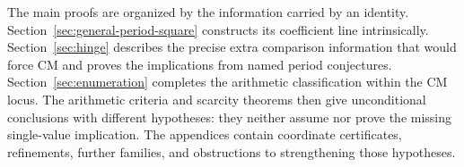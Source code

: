 The main proofs are organized by the information carried by an identity.
Section~\ref{sec:general-period-square} constructs its coefficient line
intrinsically. Section~\ref{sec:hinge} describes the precise extra
comparison information that would force CM and proves the implications
from named period conjectures. Section~\ref{sec:enumeration} completes
the arithmetic classification within the CM locus. The arithmetic
criteria and scarcity theorems then give unconditional conclusions with
different hypotheses: they neither assume nor prove the missing
single-value implication. The appendices contain coordinate
certificates, refinements, further families, and obstructions to
strengthening those hypotheses.
